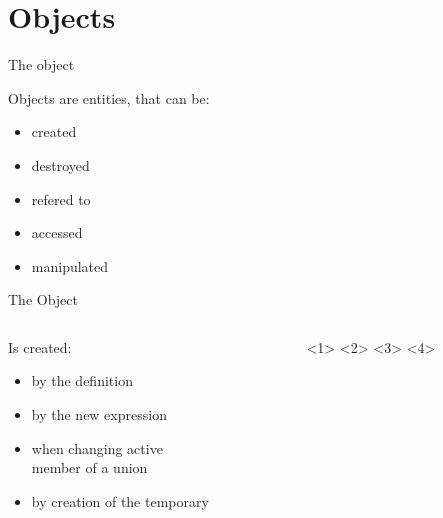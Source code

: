 \documentclass{panicsoftware-presentation}
\makeatletter
\newenvironment{itemizeSeq}{\begin{itemize}[<+-|alert@+>]}{\end{itemize}}
\makeatother
\begin{document}
\section*{Objects}

\begin{frame}{The object}

Objects are entities, that can be:
\begin{itemize}
	\item created
	\item destroyed
	\item refered to
	\item accessed
	\item manipulated
\end{itemize}

\end{frame}

\begin{frame}{The Object}

\begin{columns}[T]
	\begin{column}{0.58\linewidth}
	
	Is created:
	\begin{itemizeSeq}
		\item by the definition
		\item by the new expression
		\item when changing active\\ member of a union
		\item by creation of the temporary
	\end{itemizeSeq}
	\end{column}

	\begin{column}{0.48\linewidth}
	
	\end{column}

\end{columns}

\end{frame}
\end{document}

